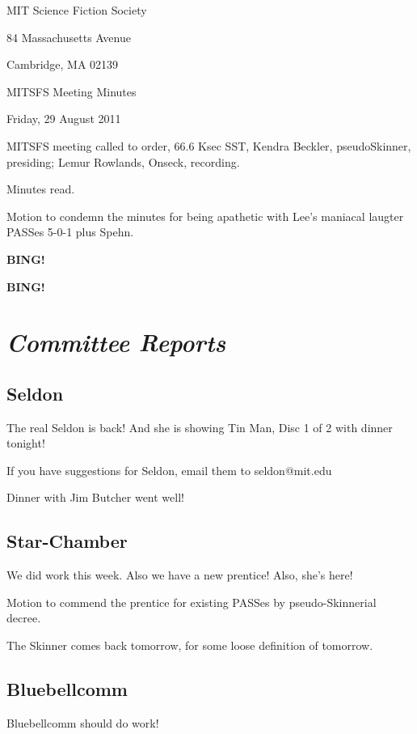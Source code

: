 \documentclass[10pt]{article}
\newcommand{\bing}{{\bf BING!} }
\newcommand{\goto}[1]{\bing \vskip 12pt \section*{{\em{#1}}}}
\newcommand{\ps}{ plus Spehn\xspace}
\newcommand{\skinner}{Kendra Beckler, pseudoSkinner}
\newcommand{\onseck}{Lemur Rowlands, Onseck}
\newcommand{\meetingdate}{Friday, 29 August 2011}
\begin{document}
\begin{center}

MIT Science Fiction Society

84 Massachusetts Avenue

Cambridge, MA 02139

\vspace{12pt}

MITSFS Meeting Minutes

\meetingdate

\end{center}

\vspace{18pt}

\setlength{\parskip}{6pt}

\noindent
MITSFS meeting called to order, 66.6 Ksec SST,
\skinner, presiding; \onseck, recording.

Minutes read.

Motion to condemn the minutes for being apathetic with Lee's maniacal
laugter PASSes 5-0-1\ps.

\bing

\goto{Committee Reports}

\subsection*{Seldon}

The real Seldon is back!  And she is showing Tin Man, Disc 1 of 2 with 
dinner tonight!

If you have suggestions for Seldon, email them to seldon@mit.edu

Dinner with Jim Butcher went well!

\subsection*{Star-Chamber}

We did work this week.  Also we have a new prentice!  Also, she's here!

Motion to commend the prentice for existing PASSes by pseudo-Skinnerial
decree.

The Skinner comes back tomorrow, for some loose definition of tomorrow.

\subsection*{Bluebellcomm}

Bluebellcomm should do work!
\end{document}

